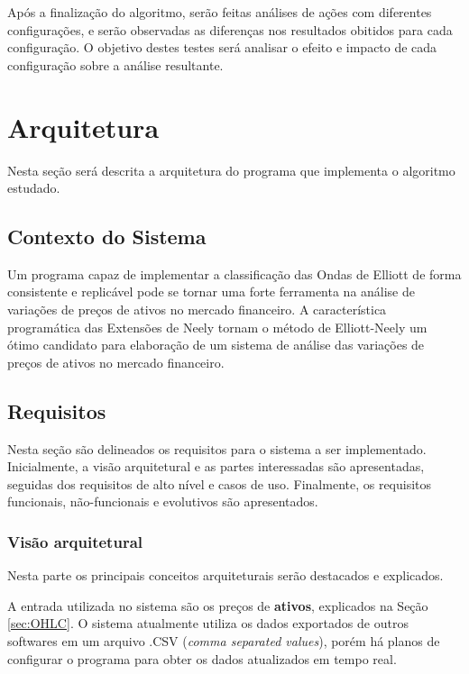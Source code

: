 \documentclass[12pt]{article}
\begin{document}
Após a finalização do algoritmo, serão feitas análises de ações com diferentes configurações,
e serão observadas as diferenças nos resultados obitidos para cada configuração.
O objetivo destes testes será analisar o efeito e impacto de cada configuração sobre a
análise resultante.

\newpage

\section{Arquitetura}

Nesta seção será descrita a arquitetura do programa que implementa o algoritmo estudado.

\subsection{Contexto do Sistema}

Um programa capaz de implementar a classificação das Ondas de Elliott de forma consistente
e replicável pode se tornar uma forte ferramenta na análise de variações de preços de ativos
no mercado financeiro. A característica programática das Extensões de Neely tornam o método
de Elliott-Neely um ótimo candidato para elaboração de um sistema de análise das
variações de preços de ativos no mercado financeiro.

\subsection{Requisitos}

Nesta seção são delineados os requisitos para o sistema a ser implementado.
Inicialmente, a visão arquitetural e as partes interessadas são apresentadas, seguidas dos
requisitos de alto nível e casos de uso. Finalmente, os requisitos funcionais,
não-funcionais e evolutivos são apresentados.

\subsubsection{Visão arquitetural}

Nesta parte os principais conceitos arquiteturais serão destacados e explicados.

A entrada utilizada no sistema são os preços de \textbf{ativos}, explicados na Seção
\ref{sec:OHLC}. O sistema atualmente utiliza os dados exportados de outros softwares
em um arquivo .CSV (\textit{comma separated values}), porém há planos de configurar
o programa para obter os dados atualizados em tempo real.
\end{document}
